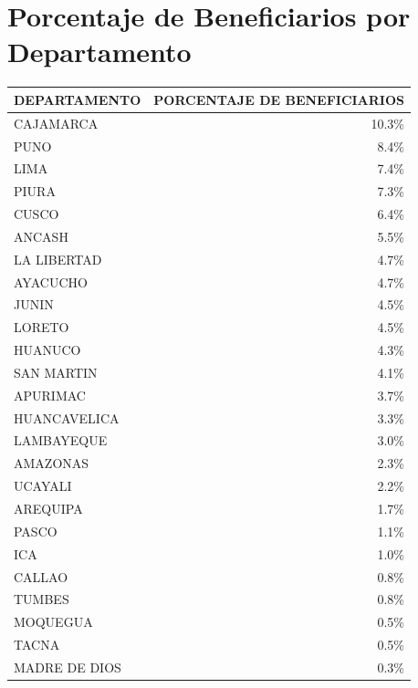 \documentclass[12pt]{article}
\begin{document}
\vspace{1cm}

\section*{Porcentaje de Beneficiarios por Departamento}

\begin{center}
	\scriptsize %
	\begin{tabular}{|l|r|}
		\hline
		\textbf{DEPARTAMENTO} & \textbf{PORCENTAJE DE BENEFICIARIOS} \\
		\hline
		CAJAMARCA        & 10.3\%                       \\
		PUNO             & 8.4\%                        \\
		LIMA             & 7.4\%                        \\
		PIURA            & 7.3\%                        \\
		CUSCO            & 6.4\%                        \\
		ANCASH           & 5.5\%                        \\
		LA LIBERTAD      & 4.7\%                        \\
		AYACUCHO         & 4.7\%                        \\
		JUNIN            & 4.5\%                        \\
		LORETO           & 4.5\%                        \\
		HUANUCO          & 4.3\%                        \\
		SAN MARTIN       & 4.1\%                        \\
		APURIMAC         & 3.7\%                        \\
		HUANCAVELICA     & 3.3\%                        \\
		LAMBAYEQUE       & 3.0\%                        \\
		AMAZONAS         & 2.3\%                        \\
		UCAYALI          & 2.2\%                        \\
		AREQUIPA         & 1.7\%                        \\
		PASCO            & 1.1\%                        \\
		ICA              & 1.0\%                        \\
		CALLAO           & 0.8\%                        \\
		TUMBES           & 0.8\%                        \\
		MOQUEGUA         & 0.5\%                        \\
		TACNA            & 0.5\%                        \\
		MADRE DE DIOS    & 0.3\%                        \\
		\hline
	\end{tabular}
\end{center}
\end{document}
